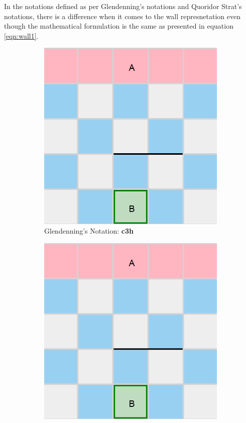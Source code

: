 In the notations defined as per Glendenning's notations and Quoridor Strat's notations, there is a difference when it comes to the wall represnetation even though the mathematical formulation is the same as presented in equation \eqref{eqn:wall1}. 

\begin{figure}[h]
    \begin{subfigure}{0.4\textwidth}
      \includegraphics[width=\textwidth]{../img/GameBoard/wall_repr.png}
      \caption{Glendenning's Notation: \textbf{c3h}}
      \label{fig:NotationDifferentA}
    \end{subfigure}
    \hfill
    \begin{subfigure}{0.4\textwidth}
      \includegraphics[width=\textwidth]{../img/GameBoard/wall_repr.png}

\end{subfigure}
\end{figure}

